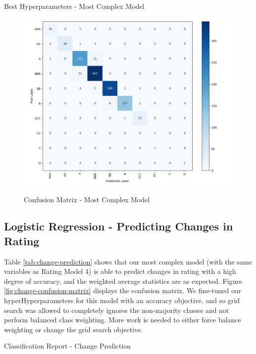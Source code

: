 \documentclass{article}[11pt]
\begin{document}
    \begin{table}[h!]
        \centering
        \caption{Best Hyperparameters - Most Complex Model}
        
        \label{tab:most-complex-best-params}
    \end{table}

    \begin{figure}[h!]
		\centering
        \caption{Confusion Matrix - Most Complex Model}
        \includegraphics[width=0.6\linewidth,keepaspectratio=true]{../Output/Modelling/Logistic Regression/rating_model_4/rating_model_4_confusion_matrix_no_title.png}
        \label{fig:most-complex-confusion-matrix}
	\end{figure}

    \clearpage
    \newpage

    \subsection{Logistic Regression - Predicting Changes in Rating}

    \label{sec:change-prediction}

    Table \ref{tab:change-prediction} shows that our most complex model (with the same variables as Rating Model 4) is able to predict changes in rating with a high degree of accuracy, and the weighted average statistics are as expected. Figure \ref{fig:change-confusion-matrix} displays the confusion matrix. We fine-tuned our hyperHyperparameters for this model with an accuracy objective, and so grid search was allowed to completely ignores the non-majority classes and not perform balanced class weighting. More work is needed to either force balance weighting or change the grid search objective.

    \begin{table}[h!]
        \centering
        \caption{Classification Report - Change Prediction}
        
        \label{tab:change-prediction}
    \end{table}
\end{document}
